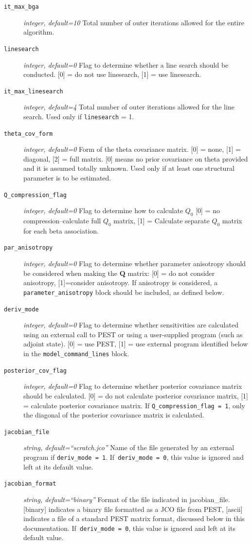 \documentclass[11pt,oneside,onecolumn]{usgsreport}
\begin{document}
\begin{appendix}
\begin{description}
\item [{\texttt{it\_max\_bga}}] \emph{integer, default=10 }Total number
of outer iterations allowed for the entire algorithm. 
\item [{\texttt{linesearch}}] \emph{integer, default=0 }Flag to determine
whether a line search should be conducted. {[}0{]} = do not use linesearch,
{[}1{]} = use linesearch. 
\item [{\texttt{it\_max\_linesearch}}] \emph{integer, default=4 }Total
number of outer iterations allowed for the line search. Used only
if \texttt{linesearch} = 1. 
\item [{\texttt{theta\_cov\_form}}] \emph{integer, default=0} Form of the
theta covariance matrix. {[}0{]} = none, {[}1{]} = diagonal, {[}2{]}
= full matrix. {[}0{]} means no prior covariance on theta provided
and it is assumed totally unknown. Used only if at least one structural
parameter is to be estimated. 
\item [{\texttt{Q\_compression\_flag}}] \emph{integer, default=0 }Flag
to determine how to calculate $Q_{0}$ {[}0{]} = no compression--calculate
full $Q_{0}$ matrix, {[}1{]} = Calculate separate $Q_{0}$ matrix
for each beta association. 
\item [{\texttt{par\_anisotropy}}] \emph{integer, default=0 }Flag to determine
whether parameter anisotropy should be considered when making the
$\mathbf{Q}$ matrix: {[}0{]} = do not consider anisotropy, {[}1{]}=consider
anisotropy. If anisotropy is considered, a \texttt{parameter\_anisotropy}
block should be included, as defined below. 
\item [{\texttt{deriv\_mode}}] \emph{integer, default=0 }Flag to determine
whether sensitivities are calculated using an external call to PEST
or using a user-supplied program (such as adjoint state). {[}0{]}
= use PEST, {[}1{]} = use external program identified below in the
\texttt{model\_command\_lines} block. 
\item [{\texttt{posterior\_cov\_flag}}] \emph{integer, default=0 }Flag
to determine whether posterior covariance matrix should be calculated.
{[}0{]} = do not calculate posterior covariance matrix, {[}1{]} =
calculate posterior covariance matrix. If \texttt{Q\_compression\_flag
= 1}, only the diagonal of the posterior covariance matrix is calculated.

\item [{\texttt{jacobian\_file}}] \emph{string, default=``scratch.jco''
}Name of the file generated by an external program if \texttt{deriv\_mode
= 1}. If\texttt{ deriv\_mode = 0}, this value is ignored and left
at its default value. 
\item [{\texttt{jacobian\_format}}] \emph{string, default=``binary'' }Format
of the file indicated in jacobian\_file. {[}binary{]} indicates a
binary file formatted as a JCO file from PEST, {[}ascii{]} indicates
a file of a standard PEST matrix format, discussed below in this documentation.
If\texttt{ deriv\_mode = 0}, this value is ignored and left at its
default value. 
\end{description}


\end{appendix}
\end{document}

